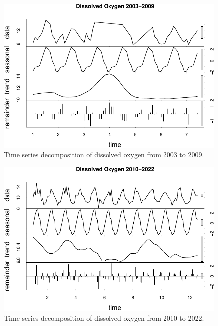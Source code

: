 \documentclass[
  12pt,
]{article}
\begin{document}
\begin{figure}

{\centering \includegraphics{Fischer_WDA_FinalProject_files/figure-latex/Plot of Early Dissolved Oxygen Time Series Decomposition-1} 

}

\caption{Time series decomposition of dissolved oxygen from 2003 to 2009.}\label{fig:Plot of Early Dissolved Oxygen Time Series Decomposition}
\end{figure}

\begin{figure}

{\centering \includegraphics{Fischer_WDA_FinalProject_files/figure-latex/Plot of Late Dissolved Oxygen Time Series Decomposition-1} 

}

\caption{Time series decomposition of dissolved oxygen from 2010 to 2022.}\label{fig:Plot of Late Dissolved Oxygen Time Series Decomposition}
\end{figure}
\end{document}

